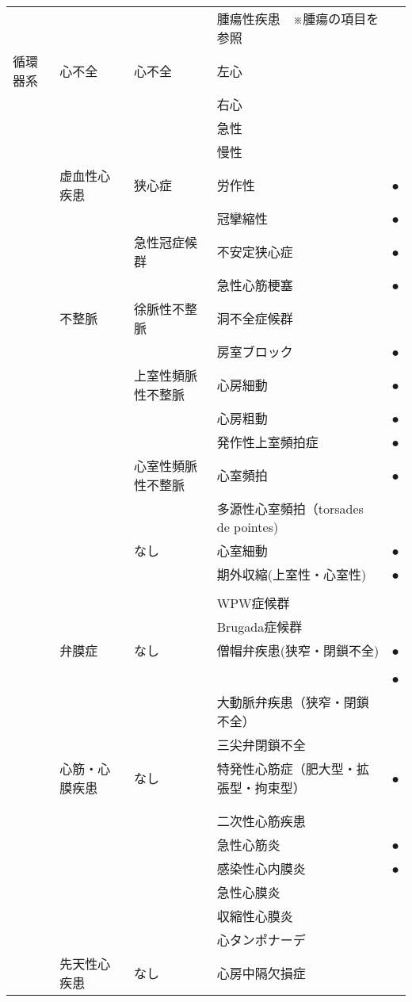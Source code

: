 \begin{xltabular}{\linewidth}{XXXXX}
 &  &  & 腫瘍性疾患　※腫瘍の項目を参照 &  \\
循環器系 & 心不全 & 心不全 & 左心 &  \\
 &  &  & 右心 &  \\
 &  &  & 急性 &  \\
 &  &  & 慢性 &  \\
 & 虚血性心疾患 & 狭心症 & 労作性 & ● \\
 &  &  & 冠攣縮性 & ● \\
 &  & 急性冠症候群 & 不安定狭心症 & ● \\
 &  &  & 急性心筋梗塞 & ● \\
 & 不整脈 & 徐脈性不整脈 & 洞不全症候群 &  \\
 &  &  & 房室ブロック & ● \\
 &  & 上室性頻脈性不整脈 & 心房細動 & ● \\
 &  &  & 心房粗動 & ● \\
 &  &  & 発作性上室頻拍症 & ● \\
 &  & 心室性頻脈性不整脈 & 心室頻拍 & ● \\
 &  &  & 多源性心室頻拍（torsades de pointes) &  \\
 &  & なし & 心室細動 & ● \\
 &  &  & 期外収縮(上室性・心室性) & ● \\
 &  &  &  &  \\
 &  &  & WPW症候群 &  \\
 &  &  & Brugada症候群 &  \\
 & 弁膜症 & なし & 僧帽弁疾患(狭窄・閉鎖不全) & ● \\
 &  &  &  &  \\
 &  &  &  & ● \\
 &  &  & 大動脈弁疾患（狭窄・閉鎖不全） &  \\
 &  &  & 三尖弁閉鎖不全 &  \\
 & 心筋・心膜疾患 & なし & 特発性心筋症（肥大型・拡張型・拘束型） & ● \\
 &  &  &  &  \\
 &  &  &  &  \\
 &  &  & 二次性心筋疾患 &  \\
 &  &  & 急性心筋炎 & ● \\
 &  &  & 感染性心内膜炎 & ● \\
 &  &  & 急性心膜炎 &  \\
 &  &  & 収縮性心膜炎 &  \\
 &  &  & 心タンポナーデ &  \\
 & 先天性心疾患 & なし & 心房中隔欠損症 &  \\

\end{xltabular}

